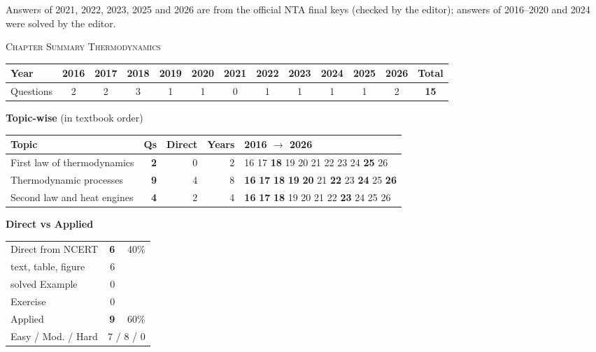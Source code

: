 {\footnotesize Answers of 2021, 2022, 2023, 2025 and 2026 are from the official NTA final keys (checked by the editor); answers of 2016--2020 and 2024 were solved by the editor.
}\par
\par{}\vspace{14pt}
\begin{center}{}\par
{\large\color{navy}\scshape Chapter Summary \textperiodcentered{} Thermodynamics}\end{center}
{\small\setlength{\tabcolsep}{3.5pt}
\begin{tabular*}{\linewidth}{@{\extracolsep{\fill}}l*{11}{c}c@{}}\toprule
Year & 2016 & 2017 & 2018 & 2019 & 2020 & 2021 & 2022 & 2023 & 2024 & 2025 & 2026 & Total\\\midrule
Questions & 2 & 2 & 3 & 1 & 1 & 0 & 1 & 1 & 1 & 1 & 2 & \textbf{15}\\\bottomrule\end{tabular*}}\par\medskip
{\small\textbf{\color{crimson}Topic-wise} (in textbook order)\par\smallskip
\begin{tabularx}{\linewidth}{@{}>{\raggedright\arraybackslash}Xrrrl@{}}\toprule
Topic & Qs & Direct & Years & 2016 $\rightarrow$ 2026\\\midrule
First law of thermodynamics & \textbf{2} & 0 & 2 & {\scriptsize {\color{gray!45}16} {\color{gray!45}17} \textbf{18} {\color{gray!45}19} {\color{gray!45}20} {\color{gray!45}21} {\color{gray!45}22} {\color{gray!45}23} {\color{gray!45}24} \textbf{25} {\color{gray!45}26}}\\
Thermodynamic processes & \textbf{9} & 4 & 8 & {\scriptsize \textbf{16} \textbf{17} \textbf{18} \textbf{19} \textbf{20} {\color{gray!45}21} \textbf{22} {\color{gray!45}23} \textbf{24} {\color{gray!45}25} \textbf{26}}\\
Second law and heat engines & \textbf{4} & 2 & 4 & {\scriptsize \textbf{16} \textbf{17} \textbf{18} {\color{gray!45}19} {\color{gray!45}20} {\color{gray!45}21} {\color{gray!45}22} \textbf{23} {\color{gray!45}24} {\color{gray!45}25} {\color{gray!45}26}}\\
\bottomrule\end{tabularx}}\par\medskip
\begin{minipage}[t]{0.34\linewidth}{\small\textbf{\color{crimson}Direct vs Applied}\par\smallskip
\begin{tabular}{@{}lrr@{}}\toprule
Direct from NCERT & \textbf{6} & 40\%\\
\quad text, table, figure & 6 &\\
\quad solved Example & 0 &\\
\quad Exercise & 0 &\\
Applied & \textbf{9} & 60\%\\\midrule
Easy / Mod. / Hard & \multicolumn{2}{r}{7 / 8 / 0}\\\bottomrule
\end{tabular}}\end{minipage}\hfill

